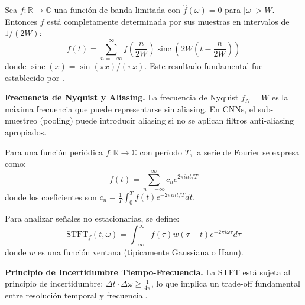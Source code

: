 \begin{theorem}\label{thm:nyquist_shannon}
Sea $f: \mathbb{R} \to \mathbb{C}$ una función de banda limitada con $\hat{f}(\omega) = 0$ para $|\omega| > W$. Entonces $f$ está completamente determinada por sus muestras en intervalos de $1/(2W)$:
\begin{equation}
f(t) = \sum_{n=-\infty}^{\infty} f\left(\frac{n}{2W}\right) \operatorname{sinc}(2W(t - \frac{n}{2W}))
\end{equation}
donde $\operatorname{sinc}(x) = \sin(\pi x)/(\pi x)$. Este resultado fundamental fue establecido por \citet{Shannon1948}.
\end{theorem}

\textbf{Frecuencia de Nyquist y Aliasing.} La frecuencia de Nyquist $f_N = W$ es la máxima frecuencia que puede representarse sin aliasing. En CNNs, el sub-muestreo (pooling) puede introducir aliasing si no se aplican filtros anti-aliasing apropiados.

\begin{definition}\label{def:serie_fourier}
Para una función periódica $f: \mathbb{R} \to \mathbb{C}$ con período $T$, la serie de Fourier se expresa como:
\begin{equation}
f(t) = \sum_{n=-\infty}^{\infty} c_n e^{2\pi i n t/T}
\end{equation}
donde los coeficientes son $c_n = \frac{1}{T} \int_0^T f(t) e^{-2\pi i n t/T} dt$.
\end{definition}

\begin{definition}\label{def:stft}
Para analizar señales no estacionarias, se define:
\begin{equation}
\text{STFT}_f(t, \omega) = \int_{-\infty}^{\infty} f(\tau) w(\tau - t) e^{-2\pi i \omega \tau} d\tau
\end{equation}
donde $w$ es una función ventana (típicamente Gaussiana o Hann).
\end{definition}

\textbf{Principio de Incertidumbre Tiempo-Frecuencia.} La STFT está sujeta al principio de incertidumbre: $\Delta t \cdot \Delta \omega \geq \frac{1}{4\pi}$, lo que implica un trade-off fundamental entre resolución temporal y frecuencial.

